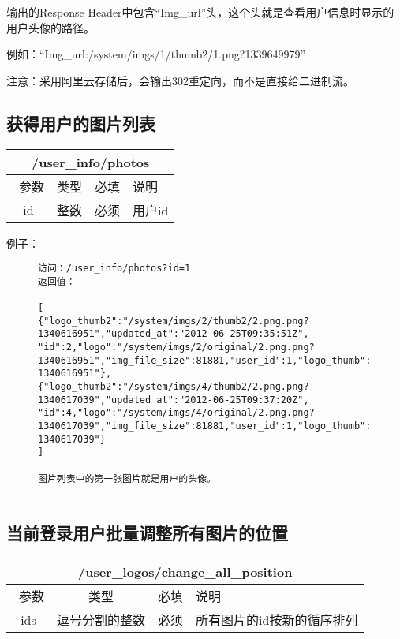 \documentclass[cs4size]{ctexartutf8}
\begin{document}
输出的Response Header中包含“Img\_url”头，这个头就是查看用户信息时显示的用户头像的路径。

例如：“Img\_url:/system/imgs/1/thumb2/1.png?1339649979”

注意：采用阿里云存储后，会输出302重定向，而不是直接给二进制流。


\subsection{获得用户的图片列表}

\begin{table}[H]
   \begin{center}
\begin{tabular}{|c|c|c|p{12cm}|}
\hline
\multicolumn{4}{|c|}{/user\_info/photos} \\
\hline\hline
 \  参数  & 类型 & 必填 &  说明  \\
\hline
 id  & 整数 & 必须 &  用户id\\
\hline
\end{tabular}
   \end{center}
\end{table}


例子：

\begin{figure}[H]
\begin{verbatim}
访问：/user_info/photos?id=1
返回值：

[
{"logo_thumb2":"/system/imgs/2/thumb2/2.png.png?1340616951","updated_at":"2012-06-25T09:35:51Z",
"id":2,"logo":"/system/imgs/2/original/2.png.png?1340616951","img_file_size":81881,"user_id":1,"logo_thumb":"/system/imgs/2/thumb/2.png.png?1340616951"},
{"logo_thumb2":"/system/imgs/4/thumb2/2.png.png?1340617039","updated_at":"2012-06-25T09:37:20Z",
"id":4,"logo":"/system/imgs/4/original/2.png.png?1340617039","img_file_size":81881,"user_id":1,"logo_thumb":"/system/imgs/4/thumb/2.png.png?1340617039"}
]

图片列表中的第一张图片就是用户的头像。


\end{verbatim}
\end{figure}



\subsection{当前登录用户批量调整所有图片的位置}

\begin{table}[H]
   \begin{center}
\begin{tabular}{|c|c|c|p{12cm}|}
\hline
\multicolumn{4}{|c|}{/user\_logos/change\_all\_position} \\
\hline\hline
 \  参数  & 类型 & 必填 &  说明  \\
\hline
 ids  & 逗号分割的整数 & 必须 &  所有图片的id按新的循序排列\\
\hline
\end{tabular}
   \end{center}
\end{table}
\end{document}
